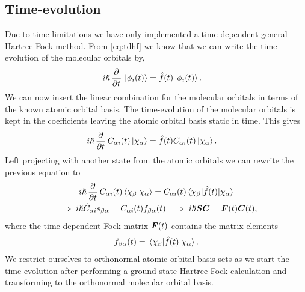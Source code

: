         \subsection{Time-evolution}
            Due to time limitations we have only implemented a time-dependent
            general Hartree-Fock method.
            From \autoref{eq:tdhf} we know that we can write the time-evolution
            of the molecular orbitals by,
            \begin{align}
                i\hslash\dpd{}{t}\ket*{\phi_i(t)}
                &= \fock(t)\ket*{\phi_i(t)}.
            \end{align}
            We can now insert the linear combination for the molecular orbitals in
            terms of the known atomic orbital basis.
            The time-evolution of the molecular orbitals is kept in the
            coefficients leaving the atomic orbital basis static in time.
            This gives
            \begin{align}
                i\hslash\dpd{}{t}C_{\alpha i}(t)\ket*{\chi_{\alpha}}
                &= \fock(t)C_{\alpha i}(t)\ket*{\chi_{\alpha}}.
            \end{align}
            Left projecting with another state from the atomic orbitals we can rewrite
            the previous equation to
            \begin{gather}
                i\hslash\dpd{}{t}C_{\alpha i}(t)\braket*{\chi_{\beta}}{\chi_{\alpha}}
                =
                C_{\alpha i}(t)\mel*{\chi_{\beta}}{\fock(t)}{\chi_{\alpha}}
                \\
                \implies
                i\hslash \dot{C}_{\alpha i} \overlapten_{\beta\alpha}
                = C_{\alpha i}(t)\fockten_{\beta\alpha}(t)
                \implies
                i\hslash \vf{S}\dot{\vf{C}}
                = \fockmat(t)\vf{C}(t),
                \label{eq:tdhf-equations}
            \end{gather}
            where the time-dependent Fock matrix $\boldsymbol{F}(t)$ contains the
            matrix elements
            \begin{align}
                f_{\beta\alpha}(t)
                = \mel*{\chi_{\beta}}{\hat{f}(t)}{\chi_\alpha}.
            \end{align}
            We restrict ourselves to orthonormal atomic orbital basis sets as we
            start the time evolution after performing a ground state
            Hartree-Fock calculation and transforming to the orthonormal
            molecular orbital basis.
